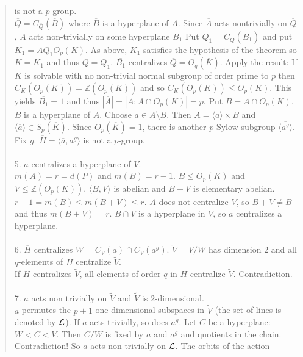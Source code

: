 \begin{quote}
is not a $p$-group.\\
${\overline Q} =C_{\overline Q}({\overline B})$  where ${\overline B}$ is a hyperplane of $A$.
Since ${\overline A}$ acts nontrivially on ${\overline Q}$, ${\overline A}$ acts non-trivially on some hyperplane ${\overline B_1}$
Put ${\overline Q_1} = C_{\overline Q}({\overline {B_1}})$ and put $K_1= A Q_1 O_p(K)$.  As above, $K_1$ satisfies the hypothesis of the theorem
so $K = K_1$ and thus $Q= Q_1$.  ${\overline {B_1}}$ centralizes ${\overline Q} = O_q({\overline K})$. Apply the result: If $K$ is solvable
with no non-trivial normal subgroup of order prime to $p$ then $C_K(O_p(K)) = {\mathbb Z}(O_p(K))$ and so $C_K(O_p(K)) \leq O_p(K)$.  This
yields ${\overline {B_1}} = 1$ and thus $|{\overline A}| = |A:A \cap O_p(K)|= p$. Put $B = A \cap O_p(K)$.  $B$  is a hyperplane of $A$.
Choose $a \in A \setminus B$.  Then $A = \langle a \rangle \times B$ and
$\langle {\overline a} \rangle \in S_p({\overline K})$.
Since $O_p({\overline K})=1$, there is another $p$ Sylow subgroup $\langle {\overline {a^g}} \rangle$. Fix $g$.
${\overline H} = \langle {\overline a}, {\overline {a^g}} \rangle$ is not a $p$-group.
\\
\\
5. $a$ centralizes a hyperplane of $V$.\\
$m(A)=r=d(P)$ and $m(B)=r-1$.  $B \leq O_p(K)$ and $V \leq {\mathbb Z}(O_p(K))$.  $\langle B, V \rangle$ is abelian and
$B+V$ is elementary abelian.  $r-1 = m(B) \leq m(B+V) \leq r$.  $A$ does not centralize $V$, so $B+V \ne B$ and thus
$m(B+V)=r$.  $B \cap V$ is a hyperplane in $V$, so $a$ centralizes a hyperplane.
\\
\\
6. ${\overline H}$ centralizes $W = C_V(a) \cap C_V(a^g)$.  ${\tilde V} = V /W$ has dimension $2$ and all $q$-elements of
${\overline H}$ centralize ${\tilde V}$.\\
If $H$ centralizes ${\tilde V}$, all elements of order $q$ in $H$ centralize ${\tilde V}$.  Contradiction.
\\
\\
7. $a$ acts non trivially on ${\tilde V}$ and ${\tilde V}$ is $2$-dimensional.\\
$a$ permutes the $p+1$ one dimensional subspaces in ${\tilde V}$ (the set of lines is denoted by ${\cal L}$).
If $a$  acts trivially, so does $a^g$.  Let $C$ be a hyperplane: $W < C < V$.  Then $C/W$ is fixed by $a$ and $a^g$
and quotients in the chain.  Contradiction!  So $a$ acts non-trivially on ${\cal L}$.  The orbits of the action

\end{quote}
